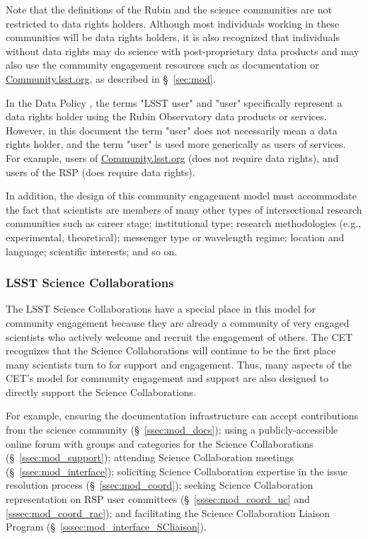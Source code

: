 \documentclass[DM,lsstdraft,toc]{lsstdoc}
\begin{document}
Note that the definitions of the Rubin and the science communities are not restricted to data rights holders. 
Although most individuals working in these communities will be data rights holders, it is also recognized that individuals without data rights may do science with post-proprietary data products  and may also use the community engagement resources such as documentation or \url{Community.lsst.org}, as described in \S~\ref{sec:mod}.

In the Data Policy , the terms "LSST user" and "user" specifically represent a data rights holder using the Rubin Observatory data products or services. 
However, in this document the term "user" does not necessarily mean a data rights holder, and the term "user" is used more generically as users of services.
For example, users of \url{Community.lsst.org} (does not require data rights), and users of the RSP (does require data rights).

In addition, the design of this community engagement model must accommodate the fact that scientists are members of many other types of intersectional research communities such as career stage; institutional type; research methodologies (e.g., experimental, theoretical); messenger type or wavelength regime; location and language; scientific interests; and so on.


\subsubsection{LSST Science Collaborations}\label{sssec:intro_comms_scicoll}

The LSST Science Collaborations have a special place in this model for community engagement because they are already a community of very engaged scientists who actively welcome and recruit the engagement of others.
The CET recognizes that the Science Collaborations will continue to be the first place many scientists turn to for support and engagement.
Thus, many aspects of the CET's model for community engagement and support are also designed to directly support the Science Collaborations.

For example, ensuring the documentation infrastructure can accept contributions from the science community (\S~\ref{ssec:mod_docs}); using a publicly-accessible online forum with groups and categories for the Science Collaborations (\S~\ref{ssec:mod_support}); attending Science Collaboration meetings (\S~\ref{ssec:mod_interface}); soliciting Science Collaboration expertise in the issue resolution process (\S~\ref{ssec:mod_coord}); seeking Science Collaboration representation on RSP user committees (\S~\ref{sssec:mod_coord_uc} and \ref{sssec:mod_coord_rac}); and facilitating the Science Collaboration Liaison Program (\S~\ref{sssec:mod_interface_SCliaison}).
\end{document}
